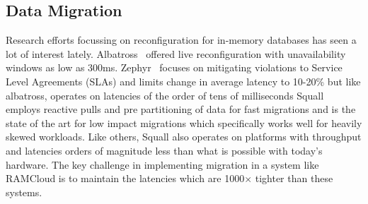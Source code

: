 \subsection{Data Migration}
Research efforts focussing on reconfiguration for in-memory databases has seen a lot of 
interest lately. Albatross~\cite{albatross} offered live reconfiguration with unavailability windows as low as 
300ms. Zephyr~\cite{zephyr} focuses on mitigating violations to Service Level Agreements (SLAs) and limits 
change in average latency to 10-20\% but like albatross, operates on latencies of the order of tens of milliseconds 
Squall~\cite{squall} employs reactive pulls and pre partitioning
of data for fast migrations and is the state of the art for low impact migrations which specifically works well for 
heavily skewed workloads. Like others, Squall also operates on platforms with throughput and latencies orders of 
magnitude less than what is possible with today's hardware. The key challenge in implementing migration in a system 
like RAMCloud is to maintain the latencies which are 1000$\times$ tighter than these systems.

